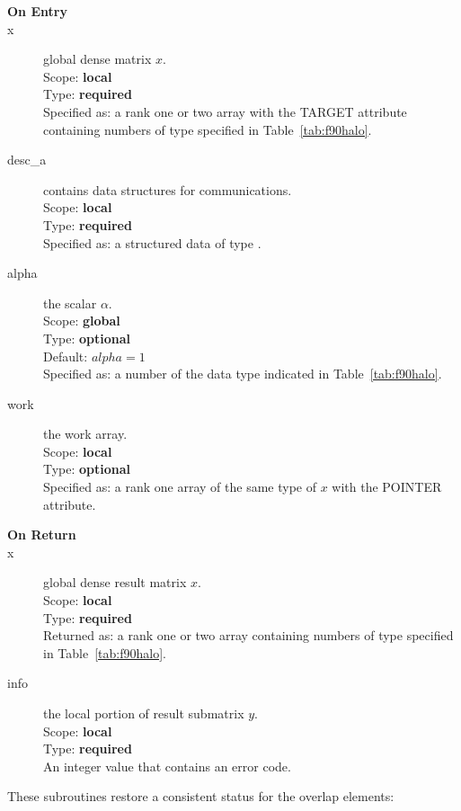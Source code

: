 \begin{description}
\item[\bf On Entry]
\item[x] global dense matrix $x$.\\
Scope: {\bf local} \\
Type: {\bf required} \\
Specified as:  a rank one or two array with the TARGET attribute
containing numbers of type specified in
Table~\ref{tab:f90halo}.
\item[desc\_a] contains data structures for communications.\\
Scope: {\bf local} \\
Type: {\bf required}\\
Specified as: a structured data of type \descdata.
\item[alpha] the scalar $\alpha$.\\
Scope: {\bf global} \\
Type: {\bf optional} \\
Default: $alpha = 1 $\\	
Specified as: a number of the data type indicated in Table~\ref{tab:f90halo}.
\item[work] the work array. \\
Scope: {\bf local} \\
Type: {\bf optional}\\
Specified as: a rank one array of the same type of $x$ with the
POINTER attribute.

\item[\bf On Return] 
\item[x] global dense result matrix $x$.\\
Scope: {\bf local} \\
Type: {\bf required} \\
Returned as:  a rank one or two array 
containing numbers of type specified in
Table~\ref{tab:f90halo}.
\item[info] the local portion of result submatrix $y$.\\
Scope: {\bf local} \\
Type: {\bf required} \\
An integer value that contains an error code. 
\end{description}
%
%



These subroutines restore a consistent status for the overlap
elements:

